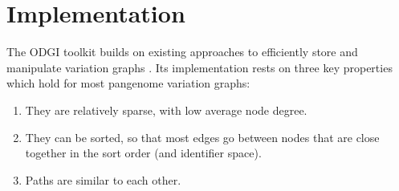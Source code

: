 \documentclass{bioinfo}
\begin{document}



\section{Implementation}

The ODGI toolkit builds on existing approaches to efficiently store and manipulate variation graphs \citep{Garrison:2018,Eizenga_2020_BX}. %
Its implementation rests on three key properties which hold for most pangenome variation graphs:

\begin{enumerate}
\item They are relatively sparse, with low average node degree.
\item They can be sorted, so that most edges go between nodes that are close together in the sort order (and identifier space).
\item Paths are similar to each other.
\end{enumerate}
\end{document}
